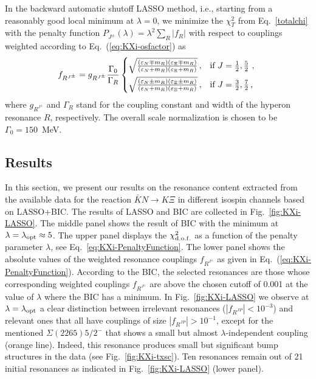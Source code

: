 \documentclass[10pt,aps,prc,superscriptaddress,twoside,twocolumn,nofootinbib,showpacs,preprintnumbers]{revtex4-1}
\begin{document}
In the backward automatic shutoff LASSO method, i.e., starting from a reasonably good local minimum at $\lambda=0$, we minimize the $\chi^2_{T}$ from Eq.~\eqref{totalchi} with the penalty function $P_{J^\pm}(\lambda)=\lambda^2\sum_R \lvert f_{R}\rvert$ with respect to couplings weighted according to Eq.~(\ref{eq:KXi-osfactor}) as
\begin{equation}
f_{R^{J^\pm}}  =  
g_{R^{J^\pm}}\frac{\Gamma_0}{\Gamma_R}
\begin{cases*}
\sqrt{\frac{(\varepsilon_N \mp m_R)(\varepsilon_\Xi  \mp m_R)}{(\varepsilon_N + m_R)(\varepsilon_\Xi  + m_R)}}\,, &  if $J=\frac12, \frac52$ , \\
\sqrt{\frac{(\varepsilon_N \pm m_R)(\varepsilon_\Xi  \pm m_R)}{(\varepsilon_N + m_R)(\varepsilon_\Xi  + m_R)}}\,, &  if $J=\frac32, \frac72$\,, 
\end{cases*}
\label{eq:KXi-PenaltyFunction}
\end{equation}
% 
where $g_{R^{J^\pm}}$ and $\Gamma_R$ stand for the coupling constant and width of the hyperon resonance $R$, respectively. The overall scale normalization is chosen to be $\Gamma_0 = 150$~MeV. 

\subsection{Results}
\label{subsec:KXi-Results}

In this section, we present our results on the resonance content extracted from the available data for the reaction $\bar KN \to K\Xi$ in different isospin channels based on LASSO+BIC. 
%
The results of LASSO and BIC are collected in Fig.~\ref{fig:KXi-LASSO}. The middle panel shows the result of  BIC with the minimum at $\lambda=\lambda_{\rm opt}\approx 5$. The upper panel displays the $\chi^2_{\rm d.o.f.}$ as a function of the penalty parameter $\lambda$, see Eq.~\eqref{eq:KXi-PenaltyFunction}. The lower panel shows the absolute values of the weighted resonance couplings $f_{R^{J^\pm}}$ as given in Eq.~(\ref{eq:KXi-PenaltyFunction}). According to the BIC, the selected resonances are those whose corresponding weighted couplings  $f_{R^{J^\pm}}$ are above the chosen cutoff of 0.001 at the value of $\lambda$ where the BIC has a  minimum. In Fig.~\ref{fig:KXi-LASSO} we observe at $\lambda=\lambda_{\rm opt}$ a clear distinction between irrelevant resonances ($|f_{R^{JP}}|<10^{-3}$) and relevant ones that all have couplings of size $|f_{R^{JP}}|>10^{-1}$, except for the mentioned $\Sigma(2265)5/2^-$ that shows a small but almost $\lambda$-independent coupling (orange line). Indeed, this resonance produces small but significant bump structures in the data (see Fig.~\ref{fig:KXi-txsc}).
Ten resonances remain out of 21 initial resonances as indicated in Fig.~\ref{fig:KXi-LASSO} (lower panel).
\end{document}
